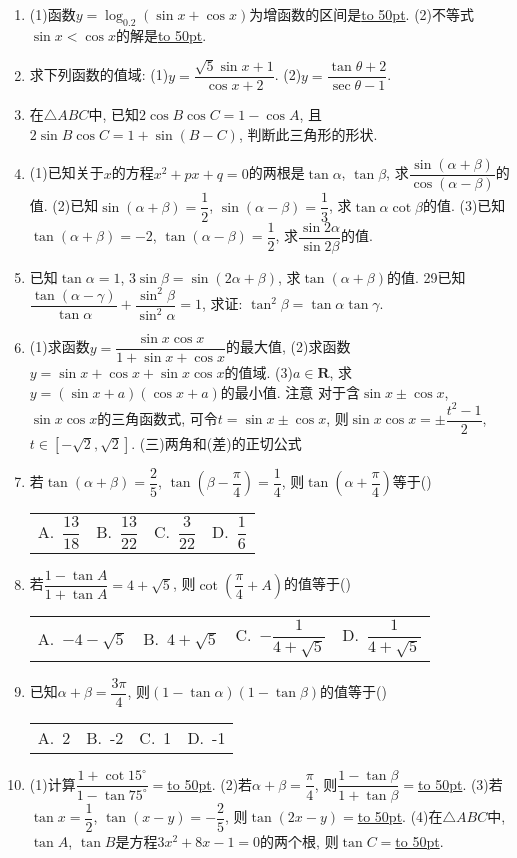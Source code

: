\documentclass[10pt,a4paper]{article}
\newcommand{\blank}[1]{\underline{\hbox to #1pt{}}}
\newcommand{\fourch}[4]{\par\begin{tabular}{p{.23\textwidth}p{.23\textwidth}p{.23\textwidth}p{.23\textwidth}}
A.~#1 &B.~#2& C.~#3& D.~#4
\end{tabular}}
\begin{document}
\begin{enumerate}[1.]
(2)计算: $\dfrac{\sin 7^\circ +\sin 8^\circ \cos 15^\circ}{\cos 7^\circ -\sin 8^\circ \sin 15^\circ}=$\blank{50}.
(3)计算: $\csc 10^\circ -\sqrt 3\sec 10^\circ =$\blank{50}.
\item (1)函数$y=\log _{0.2}(\sin x+\cos x)$为增函数的区间是\blank{50}.
(2)不等式$\sin x<\cos x$的解是\blank{50}.
\item 求下列函数的值域:
(1)$y=\dfrac{\sqrt 5\sin x+1}{\cos x+2}$.					(2)$y=\dfrac{\tan \theta +2}{\sec \theta -1}$.
\item 在$\triangle ABC$中, 已知$2\cos B\cos C=1-\cos A$, 且$2\sin B\cos C=1+\sin (B-C)$, 判断此三角形的形状.
\item (1)已知关于$x$的方程$x^2+px+q=0$的两根是$\tan \alpha$, $\tan \beta$, 求$\dfrac{\sin (\alpha +\beta)}{\cos (\alpha -\beta)}$的值.
(2)已知$\sin (\alpha +\beta)=\dfrac 12$, $\sin (\alpha -\beta)=\dfrac 13$, 求$\tan \alpha \cot \beta$的值.
(3)已知$\tan (\alpha +\beta)=-2$, $\tan (\alpha -\beta)=\dfrac 12$, 求$\dfrac{\sin 2\alpha}{\sin 2\beta}$的值.
\item 已知$\tan \alpha =1$, $3\sin \beta =\sin (2\alpha +\beta)$, 求$\tan (\alpha +\beta)$的值.
29已知$\dfrac{\tan (\alpha -\gamma)}{\tan \alpha}+\dfrac{\sin ^2\beta}{\sin ^2\alpha}=1$, 求证: $\tan ^2\beta =\tan \alpha \tan \gamma$.
\item (1)求函数$y=\dfrac{\sin x\cos x}{1+\sin x+\cos x}$的最大值,
(2)求函数$y=\sin x+\cos x+\sin x\cos x$的值域.
(3)$a\in \mathbf{R}$, 求$y=(\sin x+a)(\cos x+a)$的最小值.
注意  对于含$\sin x\pm \cos x$, $\sin x\cos x$的三角函数式, 可令$t=\sin x\pm \cos x$, 则$\sin x\cos x=\pm \dfrac{t^2-1}2$, $t\in [-\sqrt 2,\sqrt 2]$.
(三)两角和(差)的正切公式
\item 若$\tan (\alpha +\beta)=\dfrac 25$, $\tan (\beta -\dfrac{\pi}4)=\dfrac 14$, 则$\tan (\alpha +\dfrac{\pi}4)$等于()
\fourch{$\dfrac{13}{18}$}{$\dfrac{13}{22}$}{$\dfrac 3{22}$}{$\dfrac 16$}
\item 若$\dfrac{1-\tan A}{1+\tan A}=4+\sqrt 5$, 则$\cot (\dfrac{\pi}4+A)$的值等于()
\fourch{$-4-\sqrt 5$}{$4+\sqrt 5$}{$-\dfrac 1{4+\sqrt 5}$}{$\dfrac 1{4+\sqrt 5}$}
\item 已知$\alpha +\beta =\dfrac{3\pi}4$, 则$(1-\tan \alpha)(1-\tan \beta)$的值等于()
\fourch{2}{-2}{1}{-1}
\item (1)计算$\dfrac{1+\cot 15^\circ}{1-\tan 75^\circ}=$\blank{50}.
(2)若$\alpha +\beta =\dfrac{\pi}4$, 则$\dfrac{1-\tan \beta}{1+\tan \beta}=$\blank{50}.
(3)若$\tan x=\dfrac 12$, $\tan (x-y)=-\dfrac 25$, 则$\tan (2x-y)=$\blank{50}.
(4)在$\triangle ABC$中, $\tan A$, $\tan B$是方程$3x^2+8x-1=0$的两个根, 则$\tan C=$\blank{50}.

\end{enumerate}
\end{document}
